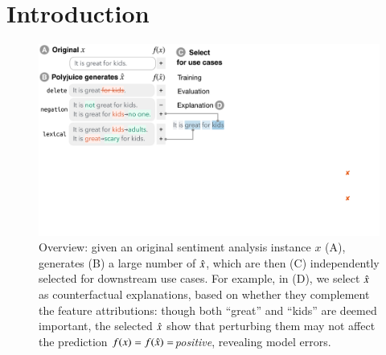 \section{Introduction}
\label{sec:intro}

\begin{figure}[t]
\centering
\includegraphics[trim={0 18cm 30.5cm 0cm},clip, width=1\columnwidth]{figures/teaser.pdf}
\vspace{-15pt}
\caption{
Overview: given an original sentiment analysis instance $x$ (A), \sysname generates (B) a large number of $\hat{x}$, which are then (C) independently selected for downstream use cases.
For example, in (D), we select $\hat{x}$ as counterfactual explanations, based on whether they complement the feature attributions: though both ``great'' and ``kids'' are deemed important, the selected $\hat{x}$ show that perturbing them may not affect the prediction $f(x)=f(\hat{x})=$\emph{positive}, revealing model errors.
}
\vspace{-15pt}
\label{fig:teaser}
\end{figure} 
 

